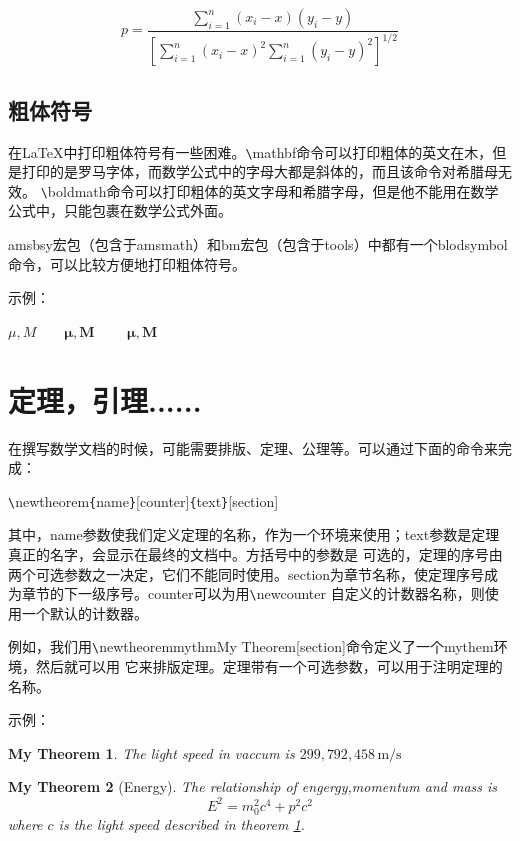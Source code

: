 \documentclass[UTF8]{ctexart}
\begin{document}
\begin{equation*}
    p = \frac{\displaystyle{\sum_{i=1}^n (x_i-x)(y_i-y)}}
        {\displaystyle{\left[\sum_{i=1}^n(x_i-x)^2
         \sum_{i=1}^n(y_i-y)^2\right]^{1/2}}}
\end{equation*}

\subsection{粗体符号}
在\LaTeX 中打印粗体符号有一些困难。\texttt{\textbackslash}mathbf命令可以打印粗体的英文在木，但是打印的是罗马字体，而数学公式中的字母大都是斜体的，而且该命令对希腊母无效。
\texttt{\textbackslash}boldmath命令可以打印粗体的英文字母和希腊字母，但是他不能用在数学公式中，只能包裹在数学公式外面。

amsbsy宏包（包含于amsmath）和bm宏包（包含于tools）中都有一个blodsymbol命令，可以比较方便地打印粗体符号。

示例：

$\mu, M\qquad \mathbf{\mu}, \mathbf{M}$
\qquad {}
$\qquad \boldsymbol{\mu}, \boldsymbol{M}$

\section{定理，引理......}
在撰写数学文档的时候，可能需要排版、定理、公理等。可以通过下面的命令来完成：

\texttt{\textbackslash}newtheorem\texttt{\{}name\texttt{\}}[counter]\texttt{\{}text\texttt{\}}[section]

其中，name参数使我们定义定理的名称，作为一个环境来使用；text参数是定理真正的名字，会显示在最终的文档中。方括号中的参数是
可选的，定理的序号由两个可选参数之一决定，它们不能同时使用。section为章节名称，使定理序号成为章节的下一级序号。counter可以为用\texttt{\textbackslash}newcounter
自定义的计数器名称，则使用一个默认的计数器。

例如，我们用\texttt{\textbackslash}newtheorem{mythm}{My Theorem}[section]命令定义了一个mythem环境，然后就可以用
它来排版定理。定理带有一个可选参数，可以用于注明定理的名称。

示例：

\newtheorem{mythm}{My Theorem}[section]

\begin{mythm}
  \label{thm:light}
  The light speed in vaccum is $299,792,458\,\mathrm{m/s}$
\end{mythm}

\begin{mythm}[Energy]
  The relationship of engergy,momentum and mass is
   \[E^2 = m_0^2 c^4 + p^2 c^2\]
   where $c$ is the light speed described in theorem \ref{thm:light}.
\end{mythm}
\end{document}
